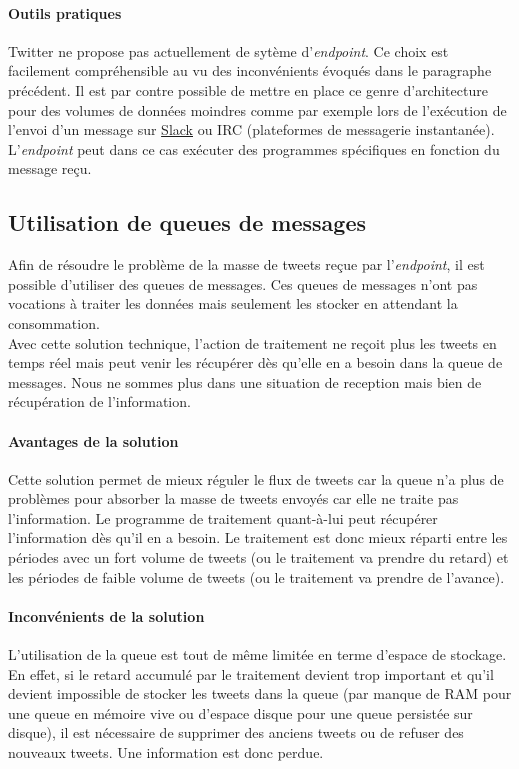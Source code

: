   \paragraph{Outils pratiques}
  \label{par:Outils pratiques}
  Twitter ne propose pas actuellement de sytème d'\textit{endpoint}. Ce choix est facilement compréhensible au vu des inconvénients évoqués dans le paragraphe précédent. Il est par contre possible de mettre en place ce genre d'architecture pour des volumes de données moindres comme par exemple lors de l'exécution de l'envoi d'un message sur \href{https://slack.com/}{Slack} ou IRC (plateformes de messagerie instantanée). L'\textit{endpoint} peut dans ce cas exécuter des programmes spécifiques en fonction du message reçu.

\subsection{Utilisation de queues de messages}
\label{sub:Utilisation de queues de messages}

  Afin de résoudre le problème de la masse de tweets reçue par l'\textit{endpoint}, il est possible d'utiliser des queues de messages. Ces queues de messages n'ont pas vocations à traiter les données mais seulement les stocker en attendant la consommation.\\

  Avec cette solution technique, l'action de traitement ne reçoit plus les tweets en temps réel mais peut venir les récupérer dès qu'elle en a besoin dans la queue de messages. Nous ne sommes plus dans une situation de reception mais bien de récupération de l'information.\\

  \paragraph{Avantages de la solution}
  \label{par:Avantages de la solution}
  Cette solution permet de mieux réguler le flux de tweets car la queue n'a plus de problèmes pour absorber la masse de tweets envoyés car elle ne traite pas l'information. Le programme de traitement quant-à-lui peut récupérer l'information dès qu'il en a besoin. Le traitement est donc mieux réparti entre les périodes avec un fort volume de tweets (ou le traitement va prendre du retard) et les périodes de faible volume de tweets (ou le traitement va prendre de l'avance).

  \paragraph{Inconvénients de la solution}
  \label{par:Inconvénients de la solution}
  L'utilisation de la queue est tout de même limitée en terme d'espace de stockage. En effet, si le retard accumulé par le traitement devient trop important et qu'il devient impossible de stocker les tweets dans la queue (par manque de RAM pour une queue en mémoire vive ou d'espace disque pour une queue persistée sur disque), il est nécessaire de supprimer des anciens tweets ou de refuser des nouveaux tweets. Une information est donc perdue.

